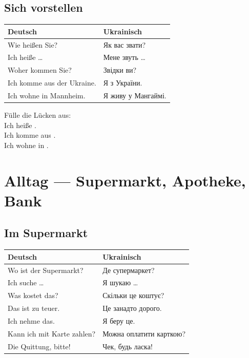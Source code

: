 \documentclass[12pt,twoside,openright]{memoir}
\begin{document}
\section{Sich vorstellen}

\begin{lernkasten}
\begin{tabular}{p{5cm} p{5cm}}
\toprule
\textbf{Deutsch} & \textbf{Ukrainisch} \\
\midrule
Wie heißen Sie? & Як вас звати? \\
Ich heiße \ldots & Мене звуть \ldots \\
Woher kommen Sie? & Звідки ви? \\
Ich komme aus der Ukraine. & Я з України. \\
Ich wohne in Mannheim. & Я живу у Мангаймі. \\
\bottomrule
\end{tabular}
\end{lernkasten}

\begin{uebungskasten}
Fülle die Lücken aus: \\[0.5em]
Ich heiße \underline{\hspace{4cm}}. \\
Ich komme aus \underline{\hspace{4cm}}. \\
Ich wohne in \underline{\hspace{4cm}}.
\end{uebungskasten}

\chapter{Alltag — Supermarkt, Apotheke, Bank}

\section{Im Supermarkt}

\begin{lernkasten}
\begin{tabular}{p{5cm} p{5cm}}
\toprule
\textbf{Deutsch} & \textbf{Ukrainisch} \\
\midrule
Wo ist der Supermarkt? & Де супермаркет? \\
Ich suche \ldots & Я шукаю \ldots \\
Was kostet das? & Скільки це коштує? \\
Das ist zu teuer. & Це занадто дорого. \\
Ich nehme das. & Я беру це. \\
Kann ich mit Karte zahlen? & Можна оплатити карткою? \\
Die Quittung, bitte! & Чек, будь ласка! \\
\bottomrule
\end{tabular}
\end{lernkasten}
\end{document}
